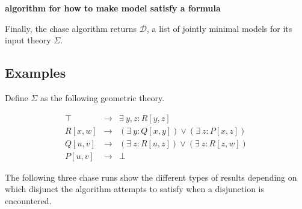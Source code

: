 		\textbf{algorithm for how to make model satisfy a formula}

		Finally, the chase algorithm returns $\mathcal{D}$, a list of jointly
		minimal models for its input theory $\Sigma$.

	\subsection{Examples}

		Define $\Sigma$ as the following geometric theory.

		\begin{eqnarray}
			\top    &  \to  &  \exists\ y,z : R[y,z]                             \\
			R[x,w]  &  \to  &  (\exists\ y : Q[x,y]) \vee (\exists\ z : P[x,z])  \\
			Q[u,v]  &  \to  &  (\exists\ z : R[u,z]) \vee (\exists\ z : R[z,w])  \\
			P[u,v]  &  \to  &  \bot
		\end{eqnarray}

		The following three chase runs show the different types of results
		depending on which disjunct the algorithm attempts to satisfy when a
		disjunction is encountered.

